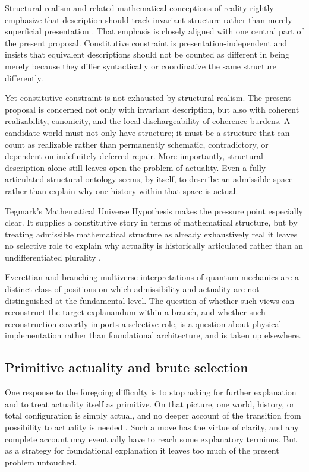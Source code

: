 \documentclass[11pt]{article}
\theoremstyle{foundation}
\begin{document}
Structural realism and related mathematical conceptions of reality rightly emphasize that description should track invariant structure rather than merely superficial presentation \citep{Worrall1989,Ladyman1998,Shapiro1997,French2014,LadymanRoss2007}. That emphasis is closely aligned with one central part of the present proposal. Constitutive constraint is presentation-independent and insists that equivalent descriptions should not be counted as different in being merely because they differ syntactically or coordinatize the same structure differently.

Yet constitutive constraint is not exhausted by structural realism. The present proposal is concerned not only with invariant description, but also with coherent realizability, canonicity, and the local dischargeability of coherence burdens. A candidate world must not only have structure; it must be a structure that can count as realizable rather than permanently schematic, contradictory, or dependent on indefinitely deferred repair. More importantly, structural description alone still leaves open the problem of actuality. Even a fully articulated structural ontology seems, by itself, to describe an admissible space rather than explain why one history within that space is actual.

Tegmark's Mathematical Universe Hypothesis makes the pressure point especially clear. It supplies a constitutive story in terms of mathematical structure, but by treating admissible mathematical structure as already exhaustively real it leaves no selective role to explain why actuality is historically articulated rather than an undifferentiated plurality \citep{Tegmark2008}.

Everettian and branching-multiverse interpretations of quantum mechanics are a distinct class of positions on which admissibility and actuality are not distinguished at the fundamental level. The question of whether such views can reconstruct the target explanandum within a branch, and whether such reconstruction covertly imports a selective role, is a question about physical implementation rather than foundational architecture, and is taken up elsewhere.

\subsection{Primitive actuality and brute selection}

One response to the foregoing difficulty is to stop asking for further explanation and to treat actuality itself as primitive. On that picture, one world, history, or total configuration is simply actual, and no deeper account of the transition from possibility to actuality is needed \citep{Lewis1986,Plantinga1974}. Such a move has the virtue of clarity, and any complete account may eventually have to reach some explanatory terminus. But as a strategy for foundational explanation it leaves too much of the present problem untouched.
\end{document}
